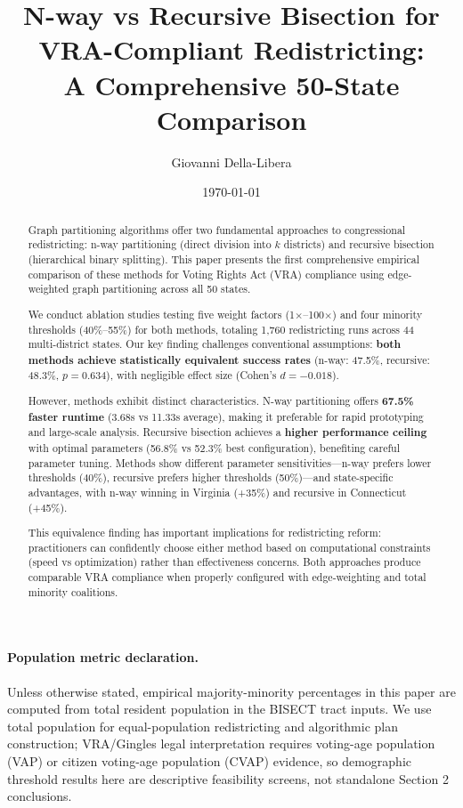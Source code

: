\documentclass[12pt]{article}
\title{N-way vs Recursive Bisection for VRA-Compliant Redistricting:\\
A Comprehensive 50-State Comparison}
\author{Giovanni Della-Libera}
\date{\today}
\begin{document}
\maketitle

\begin{abstract}
Graph partitioning algorithms offer two fundamental approaches to congressional redistricting: n-way partitioning (direct division into $k$ districts) and recursive bisection (hierarchical binary splitting). This paper presents the first comprehensive empirical comparison of these methods for Voting Rights Act (VRA) compliance using edge-weighted graph partitioning across all 50 states.

We conduct ablation studies testing five weight factors (1$\times$--100$\times$) and four minority thresholds (40\%--55\%) for both methods, totaling 1,760 redistricting runs across 44 multi-district states. Our key finding challenges conventional assumptions: \textbf{both methods achieve statistically equivalent success rates} (n-way: 47.5\%, recursive: 48.3\%, $p=0.634$), with negligible effect size (Cohen's $d=-0.018$).

However, methods exhibit distinct characteristics. N-way partitioning offers \textbf{67.5\% faster runtime} (3.68s vs 11.33s average), making it preferable for rapid prototyping and large-scale analysis. Recursive bisection achieves a \textbf{higher performance ceiling} with optimal parameters (56.8\% vs 52.3\% best configuration), benefiting careful parameter tuning. Methods show different parameter sensitivities—n-way prefers lower thresholds (40\%), recursive prefers higher thresholds (50\%)—and state-specific advantages, with n-way winning in Virginia (+35\%) and recursive in Connecticut (+45\%).

This equivalence finding has important implications for redistricting reform: practitioners can confidently choose either method based on computational constraints (speed vs optimization) rather than effectiveness concerns. Both approaches produce comparable VRA compliance when properly configured with edge-weighting and total minority coalitions.
\end{abstract}

\paragraph{Population metric declaration.} Unless otherwise stated, empirical majority-minority percentages in this paper are computed from total resident population in the BISECT tract inputs. We use total population for equal-population redistricting and algorithmic plan construction; VRA/Gingles legal interpretation requires voting-age population (VAP) or citizen voting-age population (CVAP) evidence, so demographic threshold results here are descriptive feasibility screens, not standalone Section 2 conclusions.
\end{document}
